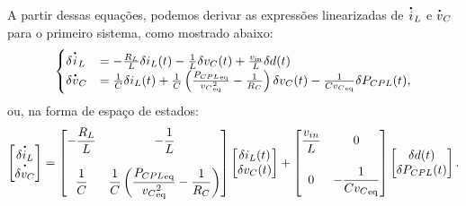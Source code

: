 A partir dessas equações, podemos derivar as expressões linearizadas de $\dt{i}_L$ e $\dt{v}_C$ para o primeiro sistema, como mostrado abaixo: \begin{equation} \begin{cases} \delta \dt{i}_L &= -\frac{R_L}{L} \delta i_L(t) - \frac{1}{L} \delta v_C(t) + \frac{v_{\text{in}}}{L} \delta d(t) \\ \delta \dt{v}_C &= \frac{1}{C} \delta i_L(t) + \frac{1}{C} \left(\frac{{P_{CPL}}_{\text{eq}}}{{v_C}^2_{\text{eq}}} - \frac{1}{R_C}\right) \delta v_C(t) - \frac{1}{C{v_C}_{\text{eq}}} \delta P_{CPL}(t), \end{cases} \end{equation} ou, na forma de espaço de estados: \begin{equation} \begin{bmatrix} \dt{\delta i_L} \\ \dt{\delta v_C} \end{bmatrix} = \begin{bmatrix} \displaystyle -\frac{R_L}{L} & \displaystyle -\frac{1}{L}  \\\\ \displaystyle \frac{1}{C} & \displaystyle \frac{1}{C}\left(\frac{{P_{CPL}}_{\text{eq}}}{{{v_{C}}^2_{\text{eq}}}} - \frac{1}{R_C}\right) \end{bmatrix} \begin{bmatrix} \delta i_L(t) \\ \delta v_C(t) \end{bmatrix} + \begin{bmatrix} {\displaystyle \frac{v_{in}}{L}} & 0 \\ \\ 0 & \displaystyle {-\frac{1}{C{v_C}_{\text{eq}}}} \end{bmatrix}  \begin{bmatrix} \delta d(t) \\ \delta P_{CPL}(t) \end{bmatrix}. \label{eq:buck_linear_system}\end{equation}

